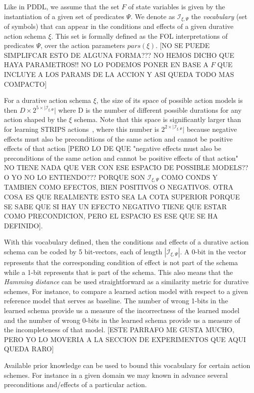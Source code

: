\documentclass{ecai}
\begin{document}
Like in PDDL, we assume that the set $F$ of state variables is given by the instantiation of a given set of predicates $\Psi$. We denote as ${\mathcal I}_{\xi,\Psi}$ the {\em vocabulary} (set of symbols) that can appear in the conditions and effects of a given durative action schema $\xi$. This set is formally defined as the FOL interpretations of predicates $\Psi$, over the action parameters $pars(\xi)$. [NO SE PUEDE SIMPLIFCAR ESTO DE ALGUNA FORMA??? NO HEMOS DICHO QUE HAYA PARAMETROS!! NO LO PODEMOS PONER EN BASE A $F$ QUE INCLUYE A LOS PARAMS DE LA ACCION Y ASI QUEDA TODO MAS COMPACTO]

For a durative action schema $\xi$, the size of its space of possible action models is then $D\times 2^{5\times|{\mathcal I}_{\xi,\Psi}}|$ where D is the number of different possible durations for any action shaped by the $\xi$ schema. Note that this space is significantly larger than for learning STRIPS actions~\cite{yang2007learning}, where this number is $2^{2\times|{\mathcal I}_{\xi,\Psi}}|$ because negative effects must also be preconditions of the same action and cannot be positive effects of that action [PERO LO DE QUE "negative effects must also be preconditions of the same action and cannot be positive effects of that action" NO TIENE NADA QUE VER CON ESE ESPACIO DE POSSIBLE MODELS?? O YO NO LO ENTIENDO??? PORQUE SON $\mathcal {I}_{\xi,\Psi}$ COMO CONDS Y TAMBIEN COMO EFECTOS, BIEN POSITIVOS O NEGATIVOS. OTRA COSA ES QUE REALMENTE ESTO SEA LA COTA SUPERIOR PORQUE SE SABE QUE SI HAY UN EFECTO NEGATIVO TIENE QUE ESTAR COMO PRECONDICION, PERO EL ESPACIO ES ESE QUE SE HA DEFINIDO].

With this vocabulary defined, then the conditions and effects of a durative action schema can be coded by 5 bit-vectors, each of length $|{\mathcal I}_{\xi,\Psi}|$. A 0-bit in the vector represents that the corresponding condition of effect is not part of the schema while a 1-bit represents that is part of the schema. This also means that the {\em Hamming distance} can be used straightforward as a similarity metric for durative schemes, For instance, to compare a learned action model with respect to a given reference model that serves as baseline. The number of wrong 1-bits in the learned schema provide us a measure of the incorrectness of the learned model and the number of wrong 0-bits in the learned schema provide us a measure of the incompleteness of that model. [ESTE PARRAFO ME GUSTA MUCHO, PERO YO LO MOVERIA A LA SECCION DE EXPERIMENTOS QUE AQUI QUEDA RARO]

Available prior knowledge can be used to bound this vocabulary for certain action schemes. For instance in a given domain we may known in advance several preconditions and/effects of a particular action.
\end{document}

